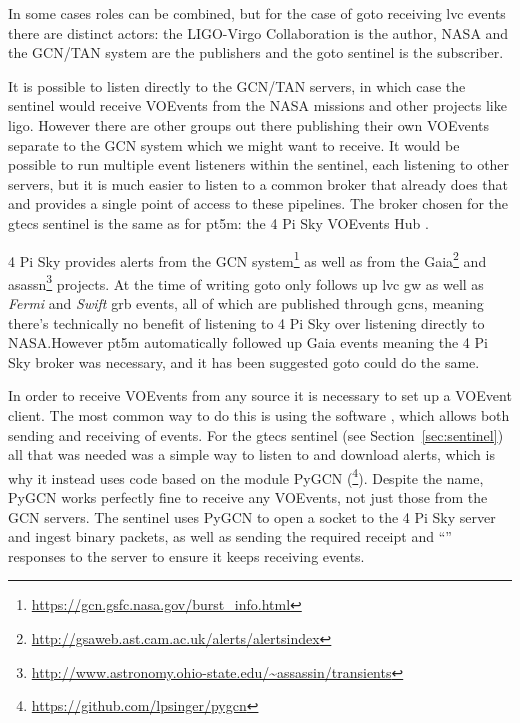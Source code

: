 \begin{colsection}
\begin{colsection}
In some cases roles can be combined, but for the case of \gls{goto} receiving \gls{lvc} events there are distinct actors: the LIGO-Virgo Collaboration is the author, NASA and the GCN/TAN system are the publishers and the \gls{goto} sentinel is the subscriber.

It is possible to listen directly to the GCN/TAN servers, in which case the sentinel would receive VOEvents from the NASA missions and other projects like \gls{ligo}. However there are other groups out there publishing their own VOEvents separate to the GCN system which we might want to receive. It would be possible to run multiple event listeners within the sentinel, each listening to other servers, but it is much easier to listen to a common broker that already does that and provides a single point of access to these pipelines. The broker chosen for the \gls{gtecs} sentinel is the same as for pt5m: the 4 Pi Sky VOEvents Hub \citep{4pisky}.

4 Pi Sky provides alerts from the GCN system\footnote{\url{https://gcn.gsfc.nasa.gov/burst_info.html}} as well as from the Gaia\footnote{\url{http://gsaweb.ast.cam.ac.uk/alerts/alertsindex}} and \gls{asassn}\footnote{\url{http://www.astronomy.ohio-state.edu/~assassin/transients}} projects. At the time of writing \gls{goto} only follows up \gls{lvc} \gls{gw} as well as \textit{Fermi} and \textit{Swift} \gls{grb} events, all of which are published through \glspl{gcn}, meaning there's technically no benefit of listening to 4 Pi Sky over listening directly to NASA.\@ However pt5m automatically followed up Gaia events meaning the 4 Pi Sky broker was necessary, and it has been suggested \gls{goto} could do the same.

In order to receive VOEvents from any source it is necessary to set up a VOEvent client. The most common way to do this is using the  software \citep{comet}, which allows both sending and receiving of events. For the \gls{gtecs} sentinel (see Section~\ref{sec:sentinel}) all that was needed was a simple way to listen to and download alerts, which is why it instead uses code based on the  module PyGCN (\footnote{\url{https://github.com/lpsinger/pygcn}}). Despite the name, PyGCN works perfectly fine to receive any VOEvents, not just those from the GCN servers. The sentinel uses PyGCN to open a socket to the 4 Pi Sky server and ingest binary packets, as well as sending the required receipt and ``'' responses to the server to ensure it keeps receiving events.


\end{colsection}
\end{colsection}
